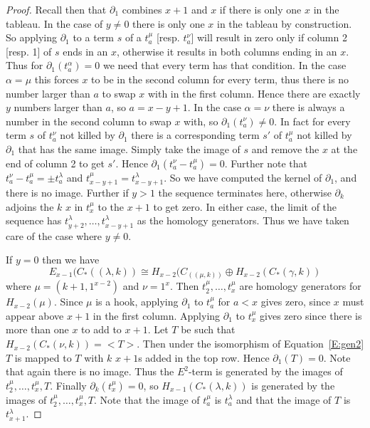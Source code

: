 \documentclass{amsart}
\begin{document}
\begin{proof}
  Recall then that $\partial_1$ combines $x+1$ and $x$ if there is only one $x$ in the tableau. In the case of $y \ne 0$ there is only one 
  $x$ in the tableau by construction. So applying $\partial_1$ to a term $s$ of a $t^\mu_a$ [resp. $t^\nu_a$] will result in zero only if 
  column 2 [resp. 1] of $s$ ends in an $x$, otherwise it results in both columns ending in an $x$. Thus for $\partial_1(t^\alpha_a)=0$ we
  need that every term has that condition. In the case $\alpha=\mu$ this forces $x$ to be in the second column for every term, thus there is
  no number larger than $a$ to swap $x$ with in the first column. Hence there are exactly $y$ numbers larger than $a$, so $a=x-y+1$.
  In the case $\alpha=\nu$ there is always a number in the second column to swap $x$ with, so $\partial_1(t^\nu_a) \ne 0$.
  In fact for every term $s$ of $t^\nu_a$ not killed by $\partial_1$ there is a corresponding term $s'$ of $t^\mu_a$ not killed by 
  $\partial_1$ that
  has the same image. Simply take the image of $s$ and remove the $x$ at the end of column 2 to get $s'$. Hence 
  $\partial_1(t^\nu_a - t^\mu_a) = 0$.  Further note that $t^\nu_a-t^\mu_a = \pm t^\lambda_a$ and $t^\mu_{x-y+1} = t^\lambda_{x-y+1}$.
  So we have computed the kernel of $\partial_1$, and there is no image. Further if $ y> 1$ the sequence terminates here, otherwise 
  $\partial_k$ adjoins the $k$ $x$ in $t^\mu_x$ to the $x+1$ to get zero. In either case, the limit of the sequence has $t^\lambda_{y+2}, 
  \ldots, t^\lambda_{x-y+1}$ as the homology generators.
  Thus we have taken care of the case where $y \ne 0$.

  If $y=0$ then we have 
  \begin{equation} \label{E:gen2} 
    E_{x-1}(C_*((\lambda,k)) \cong H_{x-2}(C_((\mu,k)) \oplus H_{x-2}(C_*(\gamma,k))
  \end{equation}
  where $\mu = (k+1, 1^{x-2})$ and $\nu = 1^x$. Then $t^\mu_2, \ldots, t^\mu_x$ are homology generators for $H_{x-2}(\mu)$. Since 
  $\mu$ is a hook, applying
  $\partial_1$ to $t^\mu_a$ for $a<x$ gives zero, since $x$ must appear above $x+1$ in the first column. Applying $\partial_1$ to 
  $t^\mu_x$ gives zero since there is more than one $x$ to add to $x+1$. Let $T$ be such that  $H_{x-2}(C_*(\nu,k)) = <T>$. Then under the 
  isomorphism of Equation~\ref{E:gen2} $T$ is mapped to $T$ with $k$ $x+1$s added in the top row. Hence $\partial_1(T) = 0$. Note that 
  again there is no image. Thus the $E^2$-term is generated by the images of $t^\mu_2, \ldots, t^\mu_x, T$. Finally $\partial_k(t^\mu_x)
  = 0$, so $H_{x-1}(C_*(\lambda,k))$ is generated by the images of $t^\mu_2, \ldots, t^\mu_x, T$. Note that the image of $t^\mu_a$ is $t^\lambda_a$
  and that the image of $T$ is $t^\lambda_{x+1}$. 


\end{proof}
\end{document}

